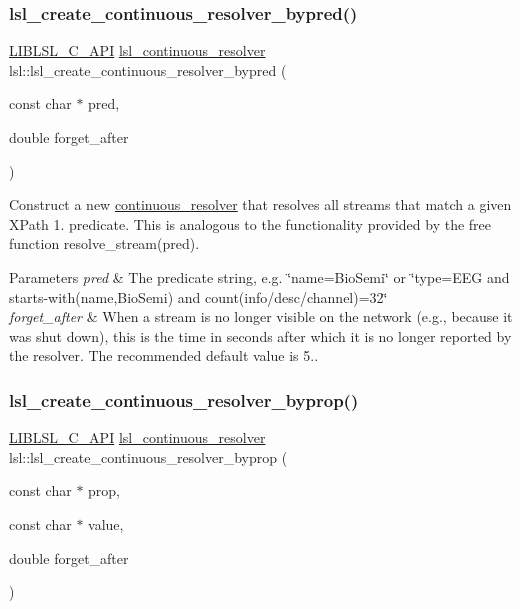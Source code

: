 \subsubsection{\texorpdfstring{lsl\+\_\+create\+\_\+continuous\+\_\+resolver\+\_\+bypred()}{lsl\_create\_continuous\_resolver\_bypred()}}
{\footnotesize\ttfamily \hyperlink{lsl__cpp_8h_aafd0ef1813e8be84a1420c4f1df64615}{L\+I\+B\+L\+S\+L\+\_\+\+C\+\_\+\+A\+PI} \hyperlink{namespacelsl_ab09ea0488f986f056322c3c866dc0a0f}{lsl\+\_\+continuous\+\_\+resolver} lsl\+::lsl\+\_\+create\+\_\+continuous\+\_\+resolver\+\_\+bypred (\begin{DoxyParamCaption}\item[{const char $\ast$}]{pred,  }\item[{double}]{forget\+\_\+after }\end{DoxyParamCaption})}

Construct a new \hyperlink{classlsl_1_1continuous__resolver}{continuous\+\_\+resolver} that resolves all streams that match a given X\+Path 1. predicate. This is analogous to the functionality provided by the free function resolve\+\_\+stream(pred). 
\begin{DoxyParams}{Parameters}
{\em pred} & The predicate string, e.\+g. \char`\"{}name=\textquotesingle{}\+Bio\+Semi\textquotesingle{}\char`\"{} or \char`\"{}type=\textquotesingle{}\+E\+E\+G\textquotesingle{} and starts-\/with(name,\textquotesingle{}\+Bio\+Semi\textquotesingle{}) and count(info/desc/channel)=32\char`\"{} \\
\hline
{\em forget\+\_\+after} & When a stream is no longer visible on the network (e.\+g., because it was shut down), this is the time in seconds after which it is no longer reported by the resolver. The recommended default value is 5.. \\
\hline
\end{DoxyParams}
\mbox{\label{namespacelsl_a673d636b9a52467485a9ff6114bcafd6}} 
\subsubsection{\texorpdfstring{lsl\+\_\+create\+\_\+continuous\+\_\+resolver\+\_\+byprop()}{lsl\_create\_continuous\_resolver\_byprop()}}
{\footnotesize\ttfamily \hyperlink{lsl__cpp_8h_aafd0ef1813e8be84a1420c4f1df64615}{L\+I\+B\+L\+S\+L\+\_\+\+C\+\_\+\+A\+PI} \hyperlink{namespacelsl_ab09ea0488f986f056322c3c866dc0a0f}{lsl\+\_\+continuous\+\_\+resolver} lsl\+::lsl\+\_\+create\+\_\+continuous\+\_\+resolver\+\_\+byprop (\begin{DoxyParamCaption}\item[{const char $\ast$}]{prop,  }\item[{const char $\ast$}]{value,  }\item[{double}]{forget\+\_\+after }\end{DoxyParamCaption})}

